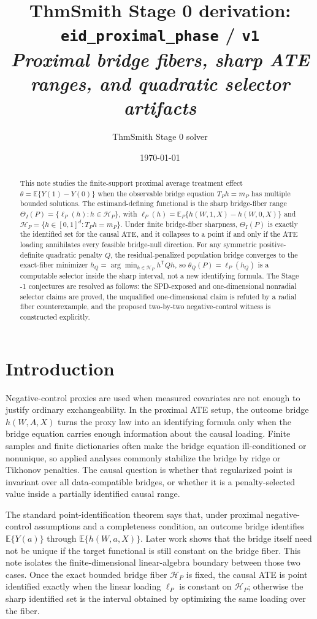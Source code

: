\documentclass[11pt]{article}
\title{ThmSmith Stage 0 derivation: \texttt{eid\_proximal\_phase} / \texttt{v1}%
  \\ \large\textit{Proximal bridge fibers, sharp ATE ranges, and quadratic selector artifacts}}
\author{ThmSmith Stage 0 solver}
\date{\today}
\newcommand{\E}{\mathbb{E}}
\newcommand{\transpose}{\mathsf{T}}
\newcommand{\calH}{\mathcal{H}}
\theoremstyle{definition}
\theoremstyle{plain}
\theoremstyle{remark}
\begin{document}
\maketitle


\begin{abstract}
This note studies the finite-support proximal average treatment effect
\(\theta=\E\{Y(1)-Y(0)\}\) when the observable bridge equation
\(T_Ph=m_P\) has multiple bounded solutions.  The estimand-defining
functional is the sharp bridge-fiber range
\(\Theta_I(P)=\{\ell_P(h):h\in\calH_P\}\), with
\(\ell_P(h)=\E_P\{h(W,1,X)-h(W,0,X)\}\) and
\(\calH_P=\{h\in[0,1]^d:T_Ph=m_P\}\).  Under finite bridge-fiber
sharpness, \(\Theta_I(P)\) is exactly the identified set for the causal
ATE, and it collapses to a point if and only if the ATE loading annihilates
every feasible bridge-null direction.  For any symmetric positive-definite
quadratic penalty \(Q\), the residual-penalized population bridge converges
to the exact-fiber minimizer \(h_Q=\arg\min_{h\in\calH_P}h^\transpose Qh\),
so \(\theta_Q(P)=\ell_P(h_Q)\) is a computable selector inside the sharp
interval, not a new identifying formula.  The Stage -1 conjectures are
resolved as follows: the SPD-exposed and one-dimensional nonradial selector
claims are proved, the unqualified one-dimensional claim is refuted by a
radial fiber counterexample, and the proposed two-by-two negative-control
witness is constructed explicitly.
\end{abstract}

\section{Introduction}
Negative-control proxies are used when measured covariates are not enough to
justify ordinary exchangeability.  In the proximal ATE setup, the outcome
bridge \(h(W,A,X)\) turns the proxy law into an identifying formula only when
the bridge equation carries enough information about the causal loading.
Finite samples and finite dictionaries often make the bridge equation
ill-conditioned or nonunique, so applied analyses commonly stabilize the
bridge by ridge or Tikhonov penalties.  The causal question is whether that
regularized point is invariant over all data-compatible bridges, or whether
it is a penalty-selected value inside a partially identified causal range.

The standard point-identification theorem says that, under proximal
negative-control assumptions and a completeness condition, an outcome bridge
identifies \(\E\{Y(a)\}\) through \(\E\{h(W,a,X)\}\).  Later work shows that
the bridge itself need not be unique if the target functional is still
constant on the bridge fiber.  This note isolates the finite-dimensional
linear-algebra boundary between those two cases.  Once the exact bounded
bridge fiber \(\calH_P\) is fixed, the causal ATE is point identified exactly
when the linear loading \(\ell_P\) is constant on \(\calH_P\); otherwise the
sharp identified set is the interval obtained by optimizing the same loading
over the fiber.
\end{document}
